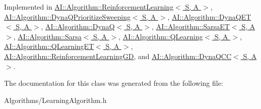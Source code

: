 Implemented in \hyperlink{classAI_1_1Algorithm_1_1ReinforcementLearning_a25d7fa245a79e61061436dc0f1db90cb}{A\-I\-::\-Algorithm\-::\-Reinforcement\-Learning$<$ S, A $>$}, \hyperlink{classAI_1_1Algorithm_1_1DynaQPrioritizeSweeping_ad08b55f3cf927189dd31abf9fc1c2959}{A\-I\-::\-Algorithm\-::\-Dyna\-Q\-Prioritize\-Sweeping$<$ S, A $>$}, \hyperlink{classAI_1_1Algorithm_1_1DynaQET_a53b0e06842fbb802acfa5384a84ad448}{A\-I\-::\-Algorithm\-::\-Dyna\-Q\-E\-T$<$ S, A $>$}, \hyperlink{classAI_1_1Algorithm_1_1DynaQ_a4542226b17db4ed8a2c5ec17d37dc42f}{A\-I\-::\-Algorithm\-::\-Dyna\-Q$<$ S, A $>$}, \hyperlink{classAI_1_1Algorithm_1_1SarsaET_adf13376b7ec8fdfa2b19ffadb1aa81e7}{A\-I\-::\-Algorithm\-::\-Sarsa\-E\-T$<$ S, A $>$}, \hyperlink{classAI_1_1Algorithm_1_1Sarsa_ae1d62478d3e31cace3fb594e05f83d1c}{A\-I\-::\-Algorithm\-::\-Sarsa$<$ S, A $>$}, \hyperlink{classAI_1_1Algorithm_1_1QLearning_a042e1987ce21a94f59603c4cb1eeed82}{A\-I\-::\-Algorithm\-::\-Q\-Learning$<$ S, A $>$}, \hyperlink{classAI_1_1Algorithm_1_1QLearningET_a9a245dcb3ca8f26b37e5a6daa6d4a898}{A\-I\-::\-Algorithm\-::\-Q\-Learning\-E\-T$<$ S, A $>$}, \hyperlink{classAI_1_1Algorithm_1_1ReinforcementLearningGD_afca8d60ac090dec611f3834c0e8872c0}{A\-I\-::\-Algorithm\-::\-Reinforcement\-Learning\-G\-D}, and \hyperlink{classAI_1_1Algorithm_1_1DynaQCC_ae23b8f0afbb9fc5024aef9ce720c9b84}{A\-I\-::\-Algorithm\-::\-Dyna\-Q\-C\-C$<$ S, A $>$}.



The documentation for this class was generated from the following file\-:\begin{DoxyCompactItemize}
\item 
Algorithms/Learning\-Algorithm.\-h\end{DoxyCompactItemize}
